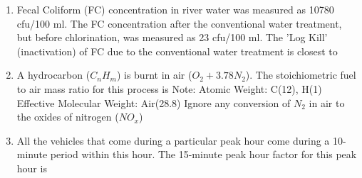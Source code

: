 \documentclass[journal,12pt,onecolumn]{article}
\theoremstyle{remark}
\begin{document}
\begin{enumerate}
\hfill{}
\begin{enumerate}
\end{enumerate}

\item Fecal Coliform (FC) concentration in river water was measured as 10780 cfu/100 ml. The FC concentration after the conventional water treatment, but before chlorination, was measured as 23 cfu/100 ml. The 'Log Kill' (inactivation) of FC due to the conventional water treatment is closest to

\hfill{}
\begin{enumerate}
\end{enumerate}

\item A hydrocarbon ($C_n H_m$) is burnt in air ($O_2 + 3.78 N_2$). The stoichiometric fuel to air mass ratio for this process is
Note: Atomic Weight: C(12), H(1)
Effective Molecular Weight: Air(28.8)
Ignore any conversion of $N_2$ in air to the oxides of nitrogen ($NO_x$)

\hfill{}
\begin{enumerate}
\end{enumerate}

\item All the vehicles that come during a particular peak hour come during a 10-minute period within this hour. The 15-minute peak hour factor for this peak hour is


\end{enumerate}
\end{document}
